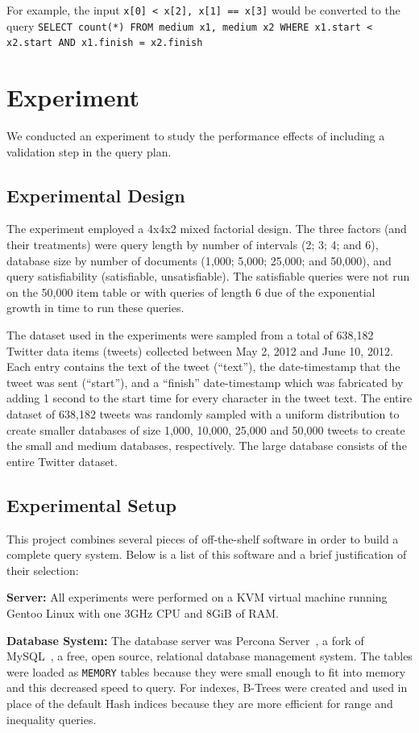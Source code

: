 \documentclass{achemso}
\begin{document}
For example, the input \texttt{x[0] < x[2], x[1] == x[3]} would be converted to the query \texttt{SELECT count(*) FROM medium x1, medium x2 WHERE x1.start < x2.start AND x1.finish = x2.finish}
\section{Experiment}
We conducted an experiment to study the performance effects of including a validation step in the query plan. 
\subsection{Experimental Design}
The experiment employed a 4x4x2 mixed factorial design. The three factors (and their treatments) were query length by number of intervals (2; 3; 4; and 6), database size by number of documents (1,000;  5,000; 25,000; and 50,000), and query satisfiability (satisfiable, unsatisfiable). The satisfiable queries were not run on the 50,000 item table or with queries of length 6 due of the exponential growth in time to run these queries.

The dataset used in the experiments were sampled from a total of 638,182 Twitter data items (tweets) collected between May 2, 2012 and June 10, 2012. Each entry contains the text of the tweet (``text''), the date-timestamp that the tweet was sent (``start''), and a ``finish''  date-timestamp which was fabricated by adding 1 second to the start time for every character in the tweet text. The entire dataset of 638,182 tweets was randomly sampled with a uniform distribution to create smaller databases of size 1,000, 10,000, 25,000 and 50,000 tweets to create the small and medium databases, respectively. The large database consists of the entire Twitter dataset. 

\subsection{Experimental Setup}
This project combines several pieces of off-the-shelf software in order to build a complete query system. Below is a list of this software and a brief justification of their selection:

\textbf{Server:} All experiments were performed on a KVM virtual machine running Gentoo Linux with one 3GHz CPU and 8GiB of RAM. 

\textbf{Database System:} The database server was Percona Server~\cite{Percona:2013}, a fork of MySQL~\cite{Oracle:2013},  a free, open source, relational database management system. The tables were loaded as \texttt{MEMORY} tables because they were small enough to fit into memory and this decreased speed to query. For indexes, B-Trees were created and used in place of the default Hash indices because they are more efficient for range and inequality queries.\cite{SQL:btree}
\end{document}

